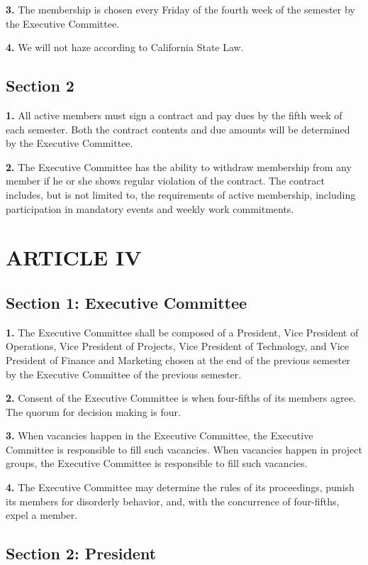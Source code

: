 \documentclass{article}
\begin{document}
\textbf{3.} The membership is chosen every Friday of the fourth week of the semester by the Executive Committee.

\textbf{4.} We will not haze according to California State Law. 

\subsection{Section 2}
\textbf{1.} All active members must sign a contract and pay dues by the fifth week of each semester. Both the contract contents and due amounts will be determined by the Executive Committee.

\textbf{2.} The Executive Committee has the ability to withdraw membership from any member if he or she shows regular violation of the contract. The contract includes, but is not limited to, the requirements of active membership, including participation in mandatory events and weekly work commitments.

\section{ARTICLE IV}
\subsection{Section 1: Executive Committee}
\textbf{1.} The Executive Committee shall be composed of a President, Vice President of Operations, Vice President of Projects, Vice President of Technology, and Vice President of Finance and Marketing chosen at the end of the previous semester by the Executive Committee of the previous semester.

\textbf{2.} Consent of the Executive Committee is when four-fifths of its members agree. The quorum for decision making is four.

\textbf{3.} When vacancies happen in the Executive Committee, the Executive Committee is responsible to fill such vacancies. When vacancies happen in project groups, the Executive Committee is responsible to fill such vacancies.

\textbf{4.} The Executive Committee may determine the rules of its proceedings, punish its members for disorderly behavior, and, with the concurrence of four-fifths, expel a member.

\subsection{Section 2: President}
\end{document}

